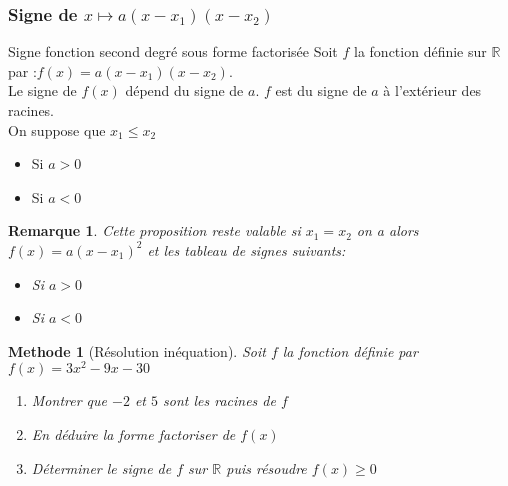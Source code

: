 \documentclass[11pt,a4paper]{article}
\def\R{{\mathbb R}}
\theoremstyle{break}
\newtheorem{Rem}{Remarque}
\newtheorem{Meth}{Methode}
\begin{document}
	\subsubsection{Signe de $x\mapsto a(x-x_1)(x-x_2)$}
	\begin{bclogo}[couleur = yellow!30,arrondi =0.1,logo =\bcbook]{Signe fonction second degré sous forme factorisée} 
		Soit $f$ la fonction définie sur $\R$ par :$f(x)=a(x-x_1)(x-x_2)$.\\
		Le signe de $f(x)$ dépend du signe de $a$. $f$ est du signe de $a$ à l'extérieur des racines.\\
		On suppose que $x_1\leqslant x_2$
		\begin{itemize}
			\item Si $a>0$\\
			
			\item Si $a<0$\\
		\end{itemize}
	\end{bclogo}
	\begin{Rem}
		Cette proposition reste valable si $x_1=x_2$ on a alors $f(x)=a(x-x_1)^2$ et les tableau de signes suivants:\\
		\begin{itemize}
			\item Si $a>0$\\
			
			\item Si $a<0$\\
		\end{itemize}
	\end{Rem}
	\begin{Meth}[Résolution inéquation]
		Soit $f$ la fonction définie par $f(x)=3x^2-9x-30$
		\begin{enumerate}
			\item Montrer que $-2$ et $5$ sont les racines de $f$
			\item En déduire la forme factoriser de $f(x)$
			\item Déterminer le signe de $f$ sur $\R$ puis résoudre $f(x)\geqslant0$
		\end{enumerate}
	\end{Meth}
	
\end{document}
